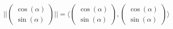 \documentclass[preview]{standalone}
\begin{document}
\begin{align*}
\lvert\lvert \begin{pmatrix} \cos(\alpha) \\ \sin(\alpha) \end{pmatrix} \rvert\rvert = \langle \begin{pmatrix} \cos(\alpha) \\ \sin(\alpha) \end{pmatrix},\begin{pmatrix} \cos(\alpha) \\ \sin(\alpha) \end{pmatrix} \rangle
\end{align*}
\end{document}
